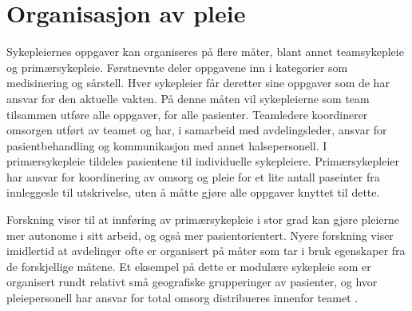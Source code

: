 \section{Organisasjon av pleie}
\label{sec:pleie}

Sykepleiernes oppgaver kan organiseres på flere måter, blant annet teamsykepleie og primærsykepleie. Førstnevnte deler oppgavene inn i kategorier som medisinering og sårstell. Hver sykepleier får deretter sine oppgaver som de har ansvar for den aktuelle vakten. På denne måten vil sykepleierne som team tilsammen utføre alle oppgaver, for alle pasienter. Teamledere koordinerer omsorgen utført av teamet og har, i samarbeid med avdelingsleder, ansvar for pasientbehandling og kommunikasjon med annet halsepersonell. I primærsykepleie tildeles pasientene til individuelle sykepleiere. Primærsykepleier har ansvar for koordinering av omsorg og pleie for et lite antall paseinter fra innleggesle til utskrivelse, uten å måtte gjøre alle oppgaver knyttet til dette. 

\noindent
Forskning viser til at innføring av primærsykepleie i stor grad kan gjøre pleierne mer autonome i sitt arbeid, og også mer pasientorientert. Nyere forskning viser imidlertid at avdelinger ofte er organisert på måter som tar i bruk egenskaper fra de forskjellige måtene. Et eksempel på dette er modulære sykepleie som er organisert rundt relativt små geografiske grupperinger av pasienter, og hvor pleiepersonell har ansvar for total omsorg distribueres innenfor teamet \citep{Rygh13}.
